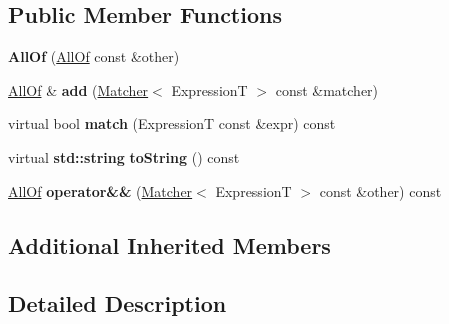 \subsection*{Public Member Functions}
\begin{DoxyCompactItemize}
\item 
\mbox{\label{class_catch_1_1_matchers_1_1_impl_1_1_generic_1_1_all_of_a31f7c5e570e79bdf64064ee87c331a59}} 
{\bfseries All\+Of} (\hyperlink{class_catch_1_1_matchers_1_1_impl_1_1_generic_1_1_all_of}{All\+Of} const \&other)
\item 
\mbox{\label{class_catch_1_1_matchers_1_1_impl_1_1_generic_1_1_all_of_a8c5cd1e494ab697076da418ee72ac297}} 
\hyperlink{class_catch_1_1_matchers_1_1_impl_1_1_generic_1_1_all_of}{All\+Of} \& {\bfseries add} (\hyperlink{struct_catch_1_1_matchers_1_1_impl_1_1_matcher}{Matcher}$<$ ExpressionT $>$ const \&matcher)
\item 
\mbox{\label{class_catch_1_1_matchers_1_1_impl_1_1_generic_1_1_all_of_a95231b6a455e1a646d0b54bce55138be}} 
virtual bool {\bfseries match} (ExpressionT const \&expr) const
\item 
\mbox{\label{class_catch_1_1_matchers_1_1_impl_1_1_generic_1_1_all_of_a8c8e7742501dc81e51a3c745d6f74119}} 
virtual \textbf{ std\+::string} {\bfseries to\+String} () const
\item 
\mbox{\label{class_catch_1_1_matchers_1_1_impl_1_1_generic_1_1_all_of_aca6497aaa7fdb6560ebe850f32ccbf15}} 
\hyperlink{class_catch_1_1_matchers_1_1_impl_1_1_generic_1_1_all_of}{All\+Of} {\bfseries operator\&\&} (\hyperlink{struct_catch_1_1_matchers_1_1_impl_1_1_matcher}{Matcher}$<$ ExpressionT $>$ const \&other) const
\end{DoxyCompactItemize}
\subsection*{Additional Inherited Members}


\subsection{Detailed Description}
